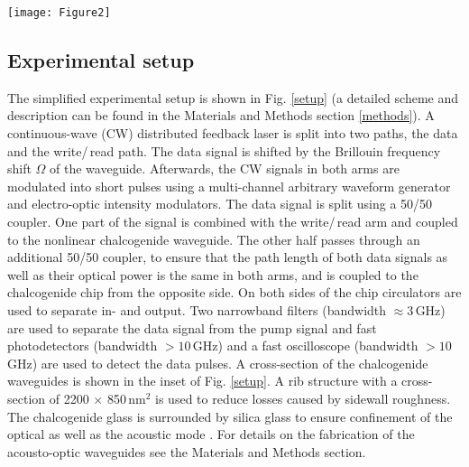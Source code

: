 \documentclass[superscriptaddress, nofootinbib, twocolumn, amsmath,amssymb, aps, pra, notitlepage, longbibliography]{revtex4-1}
\begin{document}
%
\begin{figure*}[t]
\begin{center}
  \texttt{[image: Figure2]}
  \caption{Schematic experimental setup. CW laser: continuous wave distributed feedback (DFB) laser; 50/50 fiber coupler; SSB: single-sideband modulator; IM: intensity modulator; AWG: multi-channel arbitrary waveform generator; Amplifier: Erbium-doped fiber amplifier;  BP: Bandpass filter; PD: photodetector. Inset: cross-section of the chalcogenide rib waveguide embedded in silica.}
\label{setup}
\end{center}{}
\end{figure*}
%
\subsection{Experimental setup}
%
The simplified experimental setup is shown in Fig. \ref{setup} (a detailed scheme and description can be found in the Materials and Methods section \ref{methods}). A continuous-wave (CW) distributed feedback laser is split into two paths, the data and the write/\,read path. The data signal is shifted by the Brillouin frequency shift \(\Omega\) of the waveguide. Afterwards, the CW signals in both arms are modulated into short pulses using a multi-channel arbitrary waveform generator and electro-optic intensity modulators. The data signal is split using a 50/50 coupler. One part of the signal is combined with the write/\,read arm and coupled to the nonlinear chalcogenide waveguide. The other half passes through an additional 50/50 coupler, to ensure that the path length of both data signals as well as their optical power is the same in both arms, and is coupled to the chalcogenide chip from the opposite side. On both sides of the chip circulators are used to separate in- and output. Two narrowband filters (bandwidth \(\approx 3\)\,GHz) are used to separate the data signal from the pump signal and fast photodetectors (bandwidth \(>10\)\,GHz) and a fast oscilloscope (bandwidth \(>10\)\,GHz) are used to detect the data pulses. A cross-section of the chalcogenide waveguides is shown in the inset of Fig. \ref{setup}. A rib structure with a cross-section of 2200 \(\times\) 850\,nm\(^2\) is used to reduce losses caused by sidewall roughness. The chalcogenide glass is surrounded by silica glass to ensure confinement of the optical as well as the acoustic mode \cite{Poulton2013a}. For details on the fabrication of the acousto-optic waveguides see the Materials and Methods section. \newline
%
%
\end{document}

